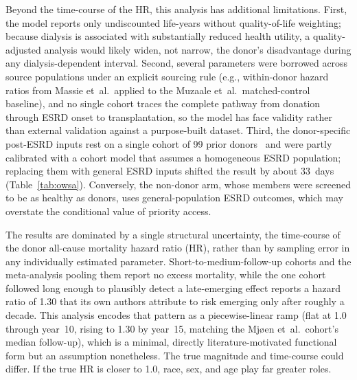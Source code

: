 Beyond the time-course of the HR, this analysis has additional limitations. First, the model reports only undiscounted life-years without quality-of-life weighting; because dialysis is associated with substantially reduced health utility, a quality-adjusted analysis would likely widen, not narrow, the donor's disadvantage during any dialysis-dependent interval. Second, several parameters were borrowed across source populations under an explicit sourcing rule (e.g., within-donor hazard ratios from Massie et~al.\ applied to the Muzaale et~al.\ matched-control baseline), and no single cohort traces the complete pathway from donation through ESRD onset to transplantation, so the model has face validity rather than external validation against a purpose-built dataset. Third, the donor-specific post-ESRD inputs rest on a single cohort of 99 prior donors~\cite{muzaale2016outcomes} and were partly calibrated with a cohort model that assumes a homogeneous ESRD population; replacing them with general ESRD inputs shifted the result by about 33~days (Table~\ref{tab:owsa}). Conversely, the non-donor arm, whose members were screened to be as healthy as donors, uses general-population ESRD outcomes, which may overstate the conditional value of priority access.

The results are dominated by a single structural uncertainty, the time-course of the donor all-cause mortality hazard ratio (HR), rather than by sampling error in any individually estimated parameter. Short-to-medium-follow-up cohorts and the meta-analysis pooling them report no excess mortality, while the one cohort followed long enough to plausibly detect a late-emerging effect reports a hazard ratio of 1.30 that its own authors attribute to risk emerging only after roughly a decade. This analysis encodes that pattern as a piecewise-linear ramp (flat at 1.0 through year~10, rising to 1.30 by year~15, matching the Mjøen et~al.\ cohort's median follow-up), which is a minimal, directly literature-motivated functional form but an assumption nonetheless. The true magnitude and time-course could differ. If the true HR is closer to 1.0, race, sex, and age play far greater roles.

